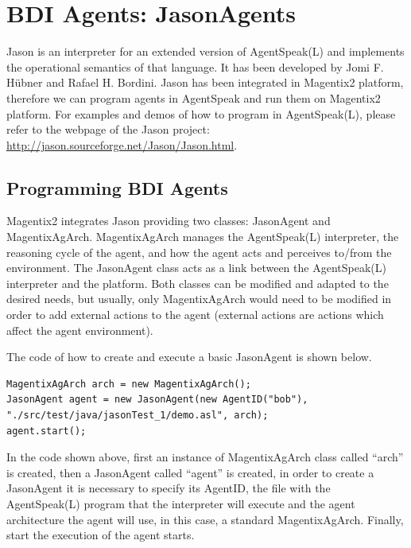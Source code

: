 \chapter{BDI Agents: JasonAgents}
Jason\cite{bordini05} is an interpreter for an extended version of AgentSpeak(L)\cite{Rao96} and implements the operational semantics of that language. It has been developed by Jomi F. H\"ubner and Rafael H. Bordini. Jason has been integrated in Magentix2 platform, therefore we can program agents in AgentSpeak and run them on Magentix2 platform. For examples and demos of how to program in AgentSpeak(L), please refer to the webpage of the Jason project: \url{http://jason.sourceforge.net/Jason/Jason.html}.


\section{Programming BDI Agents} %

Magentix2 integrates Jason providing two classes: JasonAgent and MagentixAgArch. MagentixAgArch manages the AgentSpeak(L) interpreter, the reasoning cycle of the agent, and how the agent acts and perceives to/from the environment. The JasonAgent class acts as a link between the AgentSpeak(L) interpreter and the platform. Both classes can be modified and adapted to the desired needs, but usually, only MagentixAgArch would need to be modified in order to add external actions to the agent (external actions are actions which affect the agent environment).

The code of how to create and execute a basic JasonAgent is shown below.
\begin{lstlisting}[style=Java]
MagentixAgArch arch = new MagentixAgArch();
JasonAgent agent = new JasonAgent(new AgentID("bob"), "./src/test/java/jasonTest_1/demo.asl", arch);
agent.start();
\end{lstlisting}
In the code shown above, first an instance of MagentixAgArch class called ``arch'' is created, then a JasonAgent called ``agent'' is created, in order to create a JasonAgent it is necessary to specify its AgentID, the file with the AgentSpeak(L) program that the interpreter will execute and the agent architecture the agent will use, in this case, a standard MagentixAgArch. Finally, start the execution of the agent starts.

